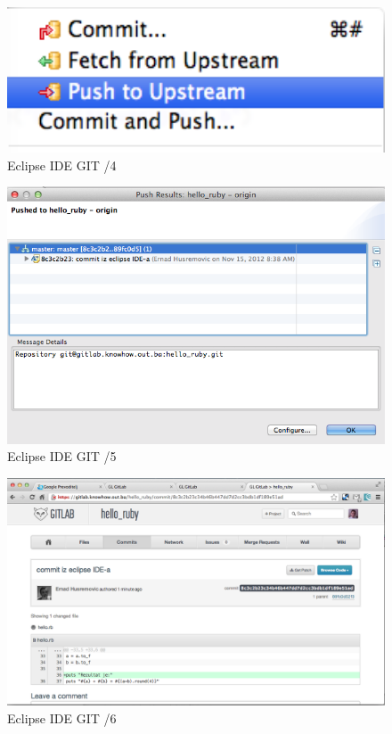 \documentclass[times, utf8, seminar]{fit}
\begin{document}
\begin{figure}[H]
\centering
\includegraphics[width=15cm]{img/eclipse_git_04.png}
\caption{Eclipse IDE GIT /4}
\end{figure}

\begin{figure}[H]
\centering
\includegraphics[width=15cm]{img/eclipse_git_05.png}
\caption{Eclipse IDE GIT /5}
\end{figure}


\begin{figure}[H]
\centering
\includegraphics[width=15cm]{img/eclipse_git_06.png}
\caption{Eclipse IDE GIT /6}
\end{figure}
\end{document}
